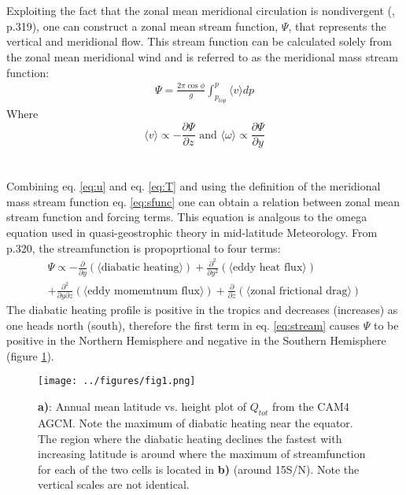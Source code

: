 \documentclass[letterpaper,12pt,titlepage,oneside,final]{book}
\begin{document}
\\
\\
Exploiting the fact that the zonal mean meridional circulation is nondivergent (\citep{holton_introduction_2004}, p.319), one can construct a zonal mean stream function, $\Psi$, that represents the vertical and meridional flow. This stream function can be calculated solely from the zonal mean meridional wind and is referred to as the meridional mass stream function:
\begin{align}\label{eq:sfunc}
\Psi=\frac{2\pi\cos{\phi}}{g}\int_{p_{top}}^{p} \langle{v}\rangle{dp}
\end{align}
Where
\begin{equation}\label{eq:test}
\langle{v}\rangle \propto -\frac{\partial{\Psi}}{\partial{z}} \text{ and } \langle{\omega}\rangle \propto\frac{\partial{\Psi}}{\partial{y}}
\end{equation}
\\
\\
Combining eq. \ref{eq:u} and eq. \ref{eq:T} and using the definition of the meridional mass stream function eq. \ref{eq:sfunc} one can obtain a relation between zonal mean stream function and forcing terms. This equation is analgous to the omega equation used in quasi-geostrophic theory in mid-latitude Meteorology. From \citep{holton_introduction_2004} p.320, the streamfunction is propoprtional to four terms:
\begin{equation}\label{eq:stream}
\begin{split}
\Psi \propto -\frac{\partial}{\partial{y}}(\langle\text{diabatic heating}\rangle) + \frac{\partial^{2}}{\partial{y^{2}}}(\langle\text{eddy heat flux}\rangle) \\ + \frac{\partial^{2}}{\partial{y}\partial{z}}(\langle\text{eddy momemtnum flux}\rangle) + \frac{\partial}{\partial{z}}(\langle\text{zonal frictional drag}\rangle) 
\end{split}
\end{equation}
The diabatic heating profile is positive in the tropics and decreases (increases) as one heads north (south), therefore the first term in eq. \ref{eq:stream} causes $\Psi$ to be positive in the Northern Hemisphere and negative in the Southern Hemisphere (figure \ref{fig:HC}).

\begin{figure}[H]
\centering
\noindent\texttt{[image: ../figures/fig1.png]}\hfill
\caption{\textbf{a)}: Annual mean latitude vs. height plot of $Q_{tot}$ from the CAM4 AGCM. Note the maximum of diabatic heating near the equator. The region where the diabatic heating declines the fastest with increasing latitude is around where the maximum of streamfunction for each of the two cells is located in \textbf{b)} (around 15S/N). Note the vertical scales are not identical.}
\label{fig:HC}
\end{figure}
\end{document}
